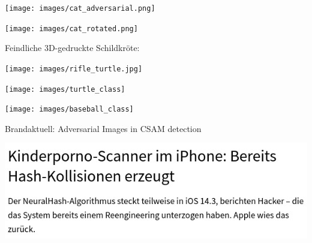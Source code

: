 \documentclass[aspectratio=169,x11names]{beamer}
\begin{document}
\begin{frame}
\begin{center}
\texttt{[image: images/cat\_adversarial.png]} 
\end{center}
\end{frame}

\begin{frame}
\begin{center}
\texttt{[image: images/cat\_rotated.png]} 
\end{center}
\end{frame}

\begin{frame}

\begin{center}
Feindliche 3D-gedruckte Schildkröte:
\end{center}

\begin{center}
\texttt{[image: images/rifle\_turtle.jpg]} 
\end{center}
\end{frame}

\begin{frame}
\begin{center}
\texttt{[image: images/turtle\_class]} 
\end{center}
\end{frame}

\begin{frame}
\begin{center}
\texttt{[image: images/baseball\_class]} 
\end{center}
\end{frame}

\begin{frame}
\begin{center}
Brandaktuell: Adversarial Images in CSAM detection
\bigskip

\includegraphics[height=0.4\textheight,keepaspectratio]{images/heise_headline_neuralhash} 
\end{center}
\end{frame}
\end{document}
